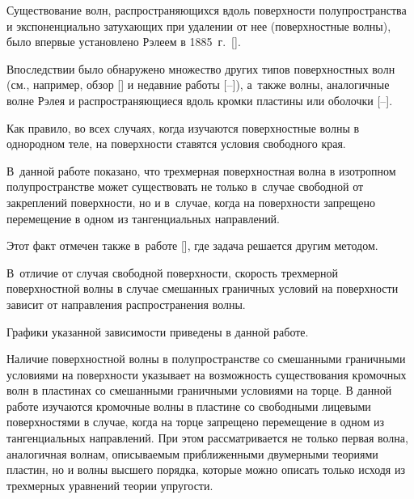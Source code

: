 \date{07/XI/2014} %










\makerutitle






Существование волн, распространяющихся вдоль поверхности полупространства и экспоненциально затухающих при удалении от нее (поверхностные волны), было впервые установлено Рэлеем в 1885~г.~[]. 

Впоследствии было обнаружено множество других типов поверхностных волн (см., например, обзор [] и недавние работы [--]), а~также волны, аналогичные волне Рэлея и распространяющиеся вдоль кромки пластины или оболочки [--]. 

Как правило, во всех случаях, когда изучаются поверхностные волны в однородном теле, на поверхности ставятся условия свободного края. 

В~данной работе показано, что трехмерная поверхностная волна в изотропном полупространстве может существовать не только в~случае свободной от закреплений поверхности, но и в~случае, когда на поверхности запрещено перемещение в одном из тангенциальных направлений. 

Этот факт отмечен также в~работе [], где задача решается другим методом. 

В~отличие от случая свободной поверхности, скорость трехмерной поверхностной волны в случае смешанных граничных условий на поверхности зависит от направления распространения волны. 

Графики указанной зависимости приведены в данной работе.



Наличие поверхностной волны в полупространстве со смешанными граничными условиями на поверхности указывает на возможность существования кромочных волн в пластинах со смешанными граничными условиями на торце. В данной работе изучаются кромочные волны в пластине со свободными лицевыми поверхностями в случае, когда на торце запрещено перемещение в одном из тангенциальных направлений. При этом рассматривается не только первая волна, аналогичная волнам, описываемым приближенными двумерными теориями пластин, но и волны высшего порядка, которые можно описать только исходя из трехмерных уравнений теории упругости. 

